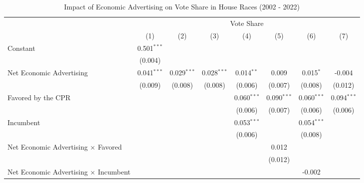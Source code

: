 
\begin{table}[htbp]
   \caption{Impact of Economic Advertising on Vote Share in House Races (2002 - 2022)}
   \bigskip
   \centering
   \small
   \begin{tabular}{lccccccc}
      \toprule
       & \multicolumn{7}{c}{Vote Share}\\
                                                    & (1)           & (2)           & (3)           & (4)           & (5)           & (6)           & (7)\\  
      \midrule 
      Constant                                      & 0.501$^{***}$ &               &               &               &               &               &   \\   
                                                    & (0.004)       &               &               &               &               &               &   \\   
      Net Economic Advertising                      & 0.041$^{***}$ & 0.029$^{***}$ & 0.028$^{***}$ & 0.014$^{**}$  & 0.009         & 0.015$^{*}$   & -0.004\\   
                                                    & (0.009)       & (0.008)       & (0.008)       & (0.006)       & (0.007)       & (0.008)       & (0.012)\\   
      Favored by the CPR                            &               &               &               & 0.060$^{***}$ & 0.090$^{***}$ & 0.060$^{***}$ & 0.094$^{***}$\\   
                                                    &               &               &               & (0.006)       & (0.007)       & (0.006)       & (0.006)\\   
      Incumbent                                     &               &               &               & 0.053$^{***}$ &               & 0.054$^{***}$ &   \\   
                                                    &               &               &               & (0.006)       &               & (0.008)       &   \\   
      Net Economic Advertising × Favored            &               &               &               &               & 0.012         &               &   \\   
                                                    &               &               &               &               & (0.012)       &               &   \\   
      Net Economic Advertising × Incumbent          &               &               &               &               &               & -0.002        &   \\   

\end{tabular}
\end{table}

